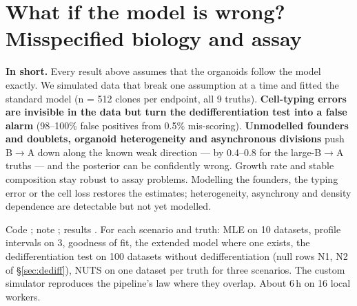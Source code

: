 \documentclass[10pt,a4paper]{article}
\newcommand{\BA}{B$\to$A}
\begin{document}
\section{What if the model is wrong? Misspecified biology and assay}\label{sec:misspec}
\begin{keybox}
\textbf{In short.} Every result above assumes that the organoids follow the model exactly. We simulated data that break one assumption at a time and fitted the standard model (n = 512 clones per endpoint, all 9 truths). \textbf{Cell-typing errors are invisible in the data but turn the dedifferentiation test into a false alarm} (98--100\% false positives from 0.5\% mis-scoring). \textbf{Unmodelled founders and doublets, organoid heterogeneity and asynchronous divisions} push \BA{} down along the known weak direction --- by 0.4--0.8 for the large-\BA{} truths --- and the posterior can be confidently wrong. Growth rate and stable composition stay robust to assay problems. Modelling the founders, the typing error or the cell loss restores the estimates; heterogeneity, asynchrony and density dependence are detectable but not yet modelled.
\end{keybox}
Code ; note ; results . For each scenario and truth: MLE on 10 datasets, profile intervals on 3, goodness of fit, the extended model where one exists, the dedifferentiation test on 100 datasets without dedifferentiation (null rows N1, N2 of \S\ref{sec:dediff}), NUTS on one dataset per truth for three scenarios. The custom simulator reproduces the pipeline's law where they overlap. About 6\,h on 16 local workers.
\end{document}
